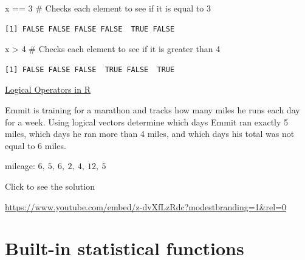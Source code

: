\documentclass[
  letterpaper,
  DIV=11,
  numbers=noendperiod]{scrreprt}
\newenvironment{Shaded}{\begin{snugshade}}{\end{snugshade}}
\newcommand{\CommentTok}[1]{\textcolor[rgb]{0.37,0.37,0.37}{#1}}
\newcommand{\DecValTok}[1]{\textcolor[rgb]{0.68,0.00,0.00}{#1}}
\newcommand{\NormalTok}[1]{\textcolor[rgb]{0.00,0.23,0.31}{#1}}
\newcommand{\SpecialCharTok}[1]{\textcolor[rgb]{0.37,0.37,0.37}{#1}}
\begin{document}
\begin{Shaded}
\begin{Highlighting}[]
\NormalTok{x }\SpecialCharTok{==} \DecValTok{3} \CommentTok{\# Checks each element to see if it is equal to 3}
\end{Highlighting}
\end{Shaded}

\begin{verbatim}
[1] FALSE FALSE FALSE FALSE  TRUE FALSE
\end{verbatim}

\begin{Shaded}
\begin{Highlighting}[]
\NormalTok{x }\SpecialCharTok{\textgreater{}} \DecValTok{4} \CommentTok{\# Checks each element to see if it is greater than 4}
\end{Highlighting}
\end{Shaded}

\begin{verbatim}
[1] FALSE FALSE FALSE  TRUE FALSE  TRUE
\end{verbatim}

\begin{watch}{}{}
    \href{https://youtu.be/IKVtf3-yO3k}{Logical Operators in R}
\end{watch}

\begin{tcolorbox}[enhanced jigsaw, colframe=quarto-callout-tip-color-frame, colback=white, breakable, rightrule=.15mm, title=\textcolor{quarto-callout-tip-color}{\faLightbulb}\hspace{0.5em}{Try it Out}, bottomtitle=1mm, toptitle=1mm, titlerule=0mm, left=2mm, coltitle=black, colbacktitle=quarto-callout-tip-color!10!white, leftrule=.75mm, opacitybacktitle=0.6, bottomrule=.15mm, opacityback=0, arc=.35mm, toprule=.15mm]

Emmit is training for a marathon and tracks how many miles he runs each
day for a week. Using logical vectors determine which days Emmit ran
exactly 5 miles, which days he ran more than 4 miles, and which days his
total was not equal to 6 miles.

mileage: \(6,\ 5,\ 6,\ 2,\ 4,\ 12,\ 5\)

Click to see the solution

\url{https://www.youtube.com/embed/z-dvXfLzRdc?modestbranding=1&rel=0}

\end{tcolorbox}

\section{Built-in statistical
functions}\label{built-in-statistical-functions}
\end{document}
